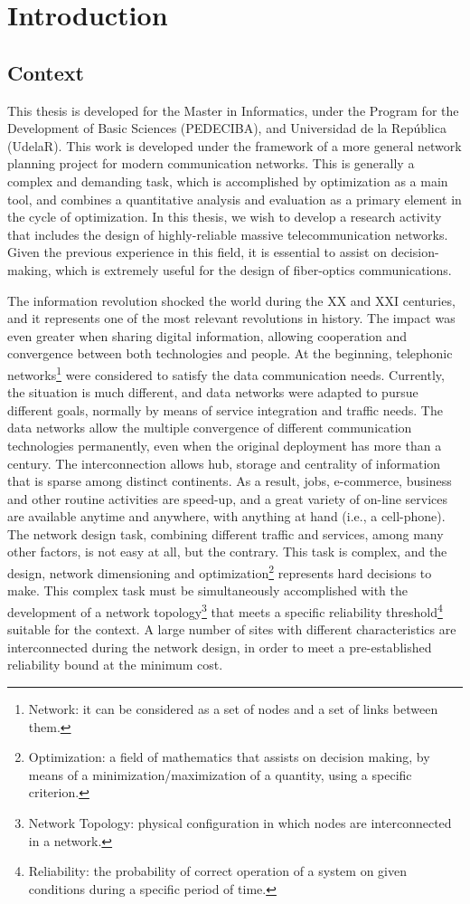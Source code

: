 \chapter{Introduction}\label{intro}
\section{Context}
This thesis is developed for the Master in Informatics, under the Program for the Development of Basic Sciences (PEDECIBA), and Universidad de la Rep\'ublica (UdelaR). This work is developed under the framework of a more general network planning project for modern communication networks. This is generally a complex and demanding task, which is accomplished by optimization as a main tool, and combines a quantitative analysis and evaluation as a primary element in the cycle of optimization. In this thesis, we wish to develop a research activity that includes the design of highly-reliable massive telecommunication networks. Given the previous experience in this field, it is essential to assist on decision-making, which is extremely useful for the design of fiber-optics communications. 

The information revolution shocked the world during the XX and XXI centuries, and it represents one of the most relevant revolutions in history. The impact was even greater when sharing digital information, allowing  cooperation and convergence between both technologies and people. At the beginning, telephonic 
networks\footnote{Network: it can be considered as a set of nodes and a set of links between them.} were 
considered to satisfy the data communication needs. Currently, the situation is much different, and data networks were adapted to pursue different goals, normally by means of service integration and traffic needs. 
The data networks allow the multiple convergence of different communication technologies permanently, even when the original deployment has more than a century. The interconnection allows hub, storage and centrality of information that is sparse among distinct continents. As a result, jobs, e-commerce, business and other routine activities are speed-up, and a great variety of on-line services are available anytime and anywhere, with anything at hand (i.e., a cell-phone). The network design task, combining different traffic and services, among many other factors, is not easy at all, but the contrary. This task is complex, and the design, network dimensioning and optimization\footnote{Optimization: a field of mathematics that assists on decision making, by means of a minimization/maximization of a quantity, using a specific criterion.} represents hard decisions to make. 
This complex task must be simultaneously accomplished with the development of a network topology\footnote{Network Topology: physical configuration in which nodes are interconnected in a network.} that meets a specific reliability threshold\footnote{Reliability: the probability of correct operation of a system on given conditions during a specific period of time.} suitable for the context. A large number of sites with different characteristics are interconnected during the network design, in order to meet a pre-established reliability bound at the minimum cost. 

